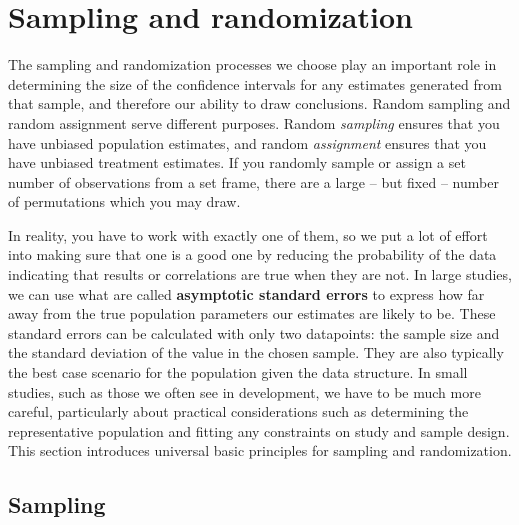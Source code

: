 



\section{Sampling and randomization}

The sampling and randomization processes we choose
play an important role in determining the size of the confidence intervals
for any estimates generated from that sample,
and therefore our ability to draw conclusions.
Random sampling and random assignment serve different purposes.
Random \textit{sampling} ensures that you have unbiased population estimates,
and random \textit{assignment} ensures that you have unbiased treatment estimates.
If you randomly sample or assign a set number of observations from a set frame,
there are a large -- but fixed -- number of permutations which you may draw.

In reality, you have to work with exactly one of them,
so we put a lot of effort into making sure that one is a good one
by reducing the probability of the data indicating that results or correlations are true when they are not.
In large studies, we can use what are called \textbf{asymptotic standard errors}
to express how far away from the true population parameters our estimates are likely to be.
These standard errors can be calculated with only two datapoints:
the sample size and the standard deviation of the value in the chosen sample.
They are also typically the best case scenario for the population given the data structure.
In small studies, such as those we often see in development,
we have to be much more careful, particularly about practical considerations
such as determining the representative population
and fitting any constraints on study and sample design.
This section introduces universal basic principles for sampling and randomization.

\subsection{Sampling}

